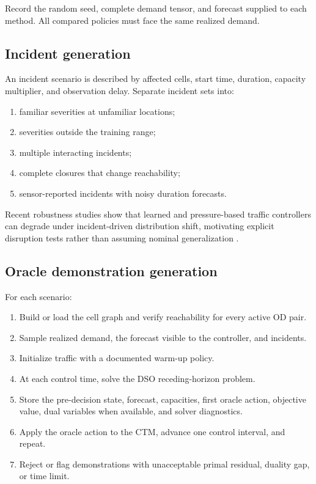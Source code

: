 \documentclass[11pt]{article}
\begin{document}
Record the random seed, complete demand tensor, and forecast supplied to each method.
All compared policies must face the same realized demand.

\subsection{Incident generation}

An incident scenario is described by affected cells, start time, duration, capacity
multiplier, and observation delay.  Separate incident sets into:

\begin{enumerate}[leftmargin=1.5em]
  \item familiar severities at unfamiliar locations;
  \item severities outside the training range;
  \item multiple interacting incidents;
  \item complete closures that change reachability;
  \item sensor-reported incidents with noisy duration forecasts.
\end{enumerate}

Recent robustness studies show that learned and pressure-based traffic controllers can
degrade under incident-driven distribution shift, motivating explicit disruption tests
rather than assuming nominal generalization \citep{nguyen2025trex}.

\subsection{Oracle demonstration generation}

For each scenario:

\begin{enumerate}[leftmargin=1.5em]
  \item Build or load the cell graph and verify reachability for every active OD pair.
  \item Sample realized demand, the forecast visible to the controller, and incidents.
  \item Initialize traffic with a documented warm-up policy.
  \item At each control time, solve the DSO receding-horizon problem.
  \item Store the pre-decision state, forecast, capacities, first oracle action,
  objective value, dual variables when available, and solver diagnostics.
  \item Apply the oracle action to the CTM, advance one control interval, and repeat.
  \item Reject or flag demonstrations with unacceptable primal residual, duality gap,
  or time limit.
\end{enumerate}
\end{document}
